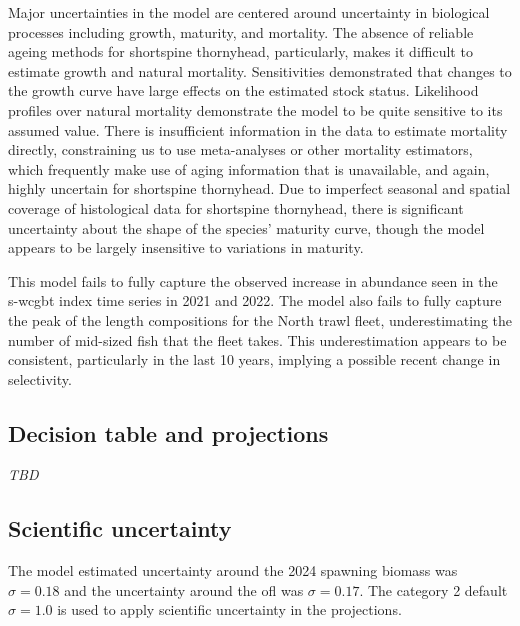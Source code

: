 \documentclass[11pt,
  english,
  letterpaper,
]{article}
\begin{document}
Major uncertainties in the model are centered around uncertainty in biological processes including growth, maturity, and mortality. The absence of reliable ageing methods for shortspine thornyhead, particularly, makes it difficult to estimate growth and natural mortality. Sensitivities demonstrated that changes to the growth curve have large effects on the estimated stock status. Likelihood profiles over natural mortality demonstrate the model to be quite sensitive to its assumed value. There is insufficient information in the data to estimate mortality directly, constraining us to use meta-analyses or other mortality estimators, which frequently make use of aging information that is unavailable, and again, highly uncertain for shortspine thornyhead. Due to imperfect seasonal and spatial coverage of histological data for shortspine thornyhead, there is significant uncertainty about the shape of the species' maturity curve, though the model appears to be largely insensitive to variations in maturity.

This model fails to fully capture the observed increase in abundance seen in the \gls{s-wcgbt} index time series in 2021 and 2022. The model also fails to fully capture the peak of the length compositions for the North trawl fleet, underestimating the number of mid-sized fish that the fleet takes. This underestimation appears to be consistent, particularly in the last 10 years, implying a possible recent change in selectivity.

\hypertarget{decision-table-and-projections}{%
\subsection*{Decision table and projections}\label{decision-table-and-projections}}

\emph{TBD}

\hypertarget{scientific-uncertainty}{%
\subsection*{Scientific uncertainty}\label{scientific-uncertainty}}

The model estimated uncertainty around the 2024 spawning biomass was \(\sigma= 0.18\) and the uncertainty around the \gls{ofl} was \(\sigma = 0.17\). The category 2 default \(\sigma = 1.0\) is used to apply scientific uncertainty in the projections.
\end{document}
